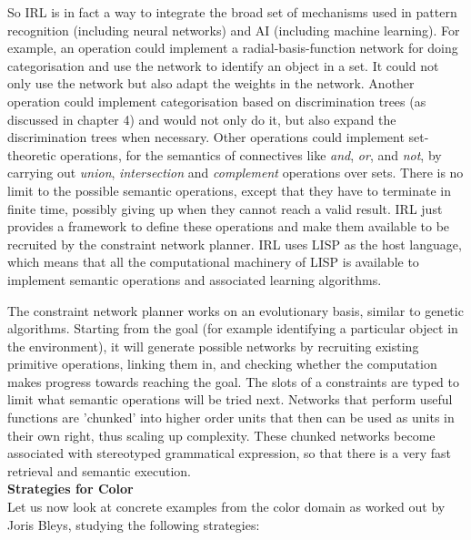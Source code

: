 So IRL is in fact a way to integrate the broad set of mechanisms used in 
pattern recognition (including neural networks) and AI (including machine learning). 
For example, an operation could implement a radial-basis-function network for doing categorisation and 
use the network to identify an object in a set. It could not only use the network but also adapt 
the weights in the network. Another operation could implement categorisation based 
on discrimination trees (as discussed in chapter 4) and would not only do it, but also expand the discrimination trees 
when necessary. Other operations could implement set-theoretic operations, 
for the semantics of connectives like {\it and}, {\it or}, and {\it not}, by carrying out
{\it union}, {\it intersection} and {\it complement} operations over sets. There is no 
limit to the possible semantic operations, except that they have to terminate in finite time, possibly giving up when 
they cannot reach a valid result. IRL just provides a framework to define these operations and make them available 
to be recruited by the constraint network planner. IRL uses LISP as the host language, which means that all 
the computational machinery of LISP is available to implement semantic operations and associated learning algorithms. 

The constraint network planner works on an evolutionary basis, similar to genetic algorithms. Starting from the goal 
(for example identifying a particular object in the environment), it will generate possible networks by recruiting 
existing primitive operations, linking them in, and checking whether the computation makes progress towards reaching the goal. 
The slots of a constraints are typed to limit what semantic operations will be tried next. Networks that perform useful 
functions are 'chunked' into higher order units that then can be used as units in their own right, thus scaling up 
complexity. These chunked networks become associated with stereotyped grammatical expression, so that there is a very 
fast retrieval and semantic execution. \\

{\bf Strategies for Color} \\

Let us now look at concrete examples from the color domain as worked out by Joris Bleys, studying the following 
strategies: 

